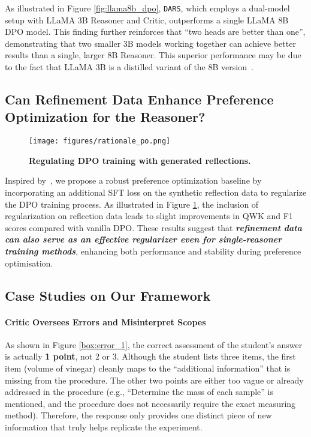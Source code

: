 As illustrated in Figure \ref{fig:llama8b_dpo}, \texttt{DARS}, which employs a dual-model setup with LLaMA 3B Reasoner and Critic, outperforms a single LLaMA 8B DPO model. This finding further reinforces that ``two heads are better than one'', demonstrating that two smaller 3B models working together can achieve better results than a single, larger 8B Reasoner. This superior performance may be due to the fact that LLaMA 3B is a distilled variant of the 8B version~\cite{llama3}.  

\subsection{Can Refinement Data Enhance Preference Optimization for the Reasoner?} \label{sec:rationale_dpo}
\begin{figure}[!h]
\centering
\texttt{[image: figures/rationale\_po.png]}
\caption{\textbf{Regulating DPO training with generated reflections.}}
\label{fig:rationale_po}
\end{figure}Inspired by~\cite{Ref_PO}, we propose a robust preference optimization baseline by incorporating an additional SFT loss on the synthetic reflection data to regularize the DPO training process. As illustrated in Figure \ref{fig:rationale_po}, the inclusion of regularization on reflection data leads to slight improvements in QWK and F1 scores compared with vanilla DPO. These results suggest that \textbf{\emph{refinement data can also serve as an effective regularizer even for single-reasoner training methods}}, enhancing both performance and stability during preference optimisation.

\subsection{Case Studies on Our Framework} \label{sec:our_case_study}

\paragraph{Critic Oversees Errors and Misinterpret Scopes}
As shown in Figure \ref{box:error_1}, the correct assessment of the student’s answer is actually \textbf{1 point}, not 2 or 3. Although the student lists three items, the first item (volume of vinegar) cleanly maps to the ``additional information'' that is missing from the procedure. The other two points are either too vague or already addressed in the procedure (e.g., ``Determine the mass of each sample'' is mentioned, and the procedure does not necessarily require the exact measuring method). Therefore, the response only provides one distinct piece of new information that truly helps replicate the experiment.

